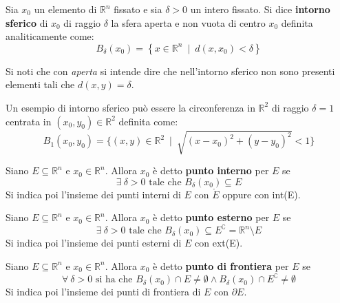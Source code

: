 \begin{definition}
    Sia $x_0$ un elemento di $\mathbb{R}^n$ fissato e sia $\delta>0$ un intero fissato. Si dice \textbf{intorno sferico} di $x_0$ di raggio $\delta$ la sfera aperta e non vuota di centro $x_0$ definita analiticamente come:
    \begin{equation}
        B_\delta(x_0)=\left\{x \in \mathbb{R}^n \ \mid \ d(x, x_0) < \delta \right\}
    \end{equation}
    \end{definition}
    \begin{oss}
        Si noti che con \textit{aperta} si intende dire che nell'intorno sferico non sono presenti elementi tali che $d(x, y)=\delta$.
    \end{oss}
    \begin{example}
        Un esempio di intorno sferico può essere la circonferenza in $\mathbb{R}^2$ di raggio $\delta=1$ centrata in $(x_0, y_0) \in \mathbb{R}^2$ definita come:
        \begin{equation*}
            B_1(x_0, y_0)= \{(x,y) \in \mathbb{R}^2 \ \mid \ \sqrt{(x-x_0)^2+(y-y_0)^2}< 1\}
        \end{equation*}
    \end{example}
\begin{definition}
    Siano $E \subseteq \mathbb{R}^n$ e $x_0 \in \mathbb{R}^n$. Allora $x_0$ è detto \textbf{punto interno} per $E$ se 
    \begin{equation}
        \exists\ \delta>0 \text{ tale che } B_\delta(x_0) \subseteq E 
    \end{equation}
    Si indica poi l'insieme dei punti interni di $E$ con $\mathring{E}$ oppure con int(E).
\end{definition}
\begin{definition}
    Siano $E \subseteq \mathbb{R}^n$ e $x_0 \in \mathbb{R}^n$. Allora $x_0$ è detto \textbf{punto esterno} per $E$ se 
    \begin{equation}
        \exists \ \delta>0 \text{ tale che } B_\delta(x_0) \subseteq E^\complement = \mathbb{R}^n \setminus E
    \end{equation}
    Si indica poi l'insieme dei punti esterni di $E$ con ext(E).
\end{definition}
\begin{definition}
    Siano $E \subseteq \mathbb{R}^n$ e $x_0 \in \mathbb{R}^n$. Allora $x_0$ è detto \textbf{punto di frontiera} per $E$ se 
    \begin{equation}
        \forall \ \delta>0 \text{ si ha che } B_\delta(x_0) \cap E \neq \emptyset \land B_\delta(x_0) \cap E^\complement \neq \emptyset 
    \end{equation}
    Si indica poi l'insieme dei punti di frontiera di $E$ con $\partial{E}$.
\end{definition}
